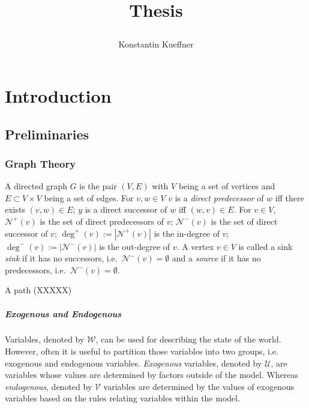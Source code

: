 \documentclass[11pt,a4paper]{book}
\title{Thesis\\
\author{Konstantin Kueffner}}
\theoremstyle{definition}
\theoremstyle{definition}
\theoremstyle{definition}
\theoremstyle{remark}
\newcommand{\gtpred}{\mathcal{N}^+}
\newcommand{\gtsucc}{\mathcal{N}^-}
\newcommand{\gtdegpred}{\deg^+}
\newcommand{\gtdegsucc}{\deg^-}
\newcommand{\cvars}{\mathcal{W}}
\newcommand{\cenvars}{\mathcal{V}}
\newcommand{\cexvars}{\mathcal{U}}
\begin{document}
\maketitle

\chapter{Introduction}


\section{Preliminaries}

\subsection{Graph Theory}  
A directed graph $G$ is the pair $(V,E)$ with $V$ being a set of vertices and $E \subset V\times V$ being a set of edges. For $v,w \in V$ $v$ is a \emph{direct predecessor} of $w$  iff there exists $(v,w) \in E$; $y$ is a direct successor of $w$ iff $(w,v) \in E$. For $v \in V$, $\gtpred(v)$ is the set of direct predecessors of $v$; $\gtsucc(v)$ is the set of direct successor of $v$; $\gtdegpred(v):= |\gtpred(v)|$ is the in-degree of $v$; $\gtdegsucc(v):= |\gtsucc(v)|$ is the out-degree of $v$. A vertex $v\in V$ is called a sink \emph{sink} if it has no successors, i.e.\ $\gtsucc(v) = \emptyset$ and a \emph{source} if it has no predecessors, i.e.\ $\gtsucc(v) = \emptyset$.



A path (XXXXX)


\paragraph{Exogenous and Endogenous} Variables, denoted by $\cvars$, can be used for describing the state of the world. However, often it is useful to partition those variables into two groups, i.e. exogenous and endogenous variables. \emph{Exogenous} variables, denoted by $\cexvars$, are variables whose values are determined by factors outside of the model. Whereas \emph{endogenous}, denoted by $\cenvars$ variables are determined by the values of exogenous variables based on the rules relating variables within the model. 
\end{document}
